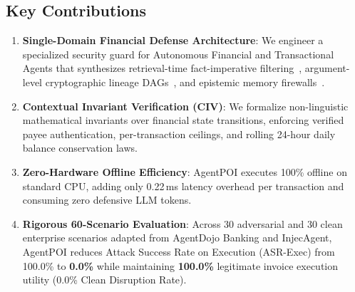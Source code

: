 \subsection{Key Contributions}
\begin{enumerate}
    \item \textbf{Single-Domain Financial Defense Architecture}: We engineer a specialized security guard for Autonomous Financial and Transactional Agents that synthesizes retrieval-time fact-imperative filtering~\cite{taskshield2025}, argument-level cryptographic lineage DAGs~\cite{authgraph2026,fan2026granularity}, and epistemic memory firewalls~\cite{datasentinel2025}.
    \item \textbf{Contextual Invariant Verification (CIV)}: We formalize non-linguistic mathematical invariants over financial state transitions, enforcing verified payee authentication, per-transaction ceilings, and rolling 24-hour daily balance conservation laws.
    \item \textbf{Zero-Hardware Offline Efficiency}: AgentPOI executes 100\% offline on standard CPU, adding only 0.22\,ms latency overhead per transaction and consuming zero defensive LLM tokens.
    \item \textbf{Rigorous 60-Scenario Evaluation}: Across 30 adversarial and 30 clean enterprise scenarios adapted from AgentDojo Banking and InjecAgent, AgentPOI reduces Attack Success Rate on Execution (ASR-Exec) from 100.0\% to \textbf{0.0\%} while maintaining \textbf{100.0\%} legitimate invoice execution utility (0.0\% Clean Disruption Rate).
\end{enumerate}
